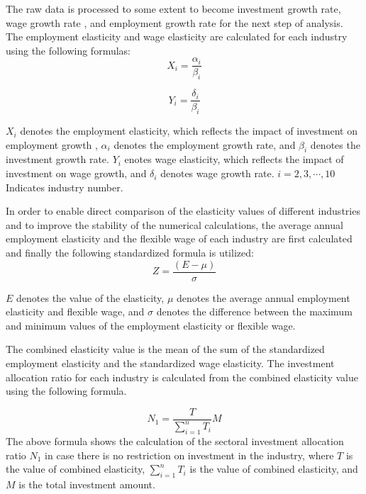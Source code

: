 \documentclass[12pt]{article}  %
\begin{document}
	The raw data is processed to some extent to become investment growth rate, wage growth rate \cite{5}, and employment growth rate for the next step of analysis.
	The employment elasticity and wage elasticity are calculated for each industry using the following formulas:
		\begin{equation}
			{X_i} = \frac{{{\alpha _i}}}{{{\beta _i}}}
		\end{equation}
	
		\begin{equation}
			{Y_i} = \frac{{{\delta _i}}}{{{\beta _i}}}
		\end{equation}

	$X_i$ denotes the employment elasticity, which reflects the impact of investment on employment growth \cite{3}, $\alpha _i$ denotes the employment growth rate, and $\beta _i$ denotes the investment growth rate. $Y_i$ enotes wage elasticity, which reflects the impact of investment on wage growth, and ${\delta_i}$ denotes wage growth rate. ${i=2, 3, \cdots, 10}$ Indicates industry number.
	
	In order to enable direct comparison of the elasticity values of different industries and to improve the stability of the numerical calculations, the average annual employment elasticity and the flexible wage of each industry are first calculated and finally the following standardized formula is utilized:
	\begin{equation}
		Z = \frac{{(E - \mu )}}{\sigma }
	\end{equation}
			

	$E$ denotes the value of the elasticity, $\mu $ denotes the average annual employment elasticity and flexible wage, and $\sigma $ denotes the difference between the maximum and minimum values of the employment elasticity or flexible wage.
	
	The combined elasticity value is the mean of the sum of the standardized employment elasticity and the standardized wage elasticity. The investment allocation ratio for each industry is calculated from the combined elasticity value using the following formula.

	\begin{equation}
		{N_1} = \frac{T}{{\sum\limits_{i = 1}^n {{T_i}} }}M
	\end{equation}
	The above formula shows the calculation of the sectoral investment allocation ratio	$N_1$ in case there is no restriction on investment in the industry, where $T$ is the value of combined elasticity, $\sum\limits_{i = 1}^n {{T_i}} $ is the value of combined elasticity, and $M$ is the total investment amount.
	
\end{document}
